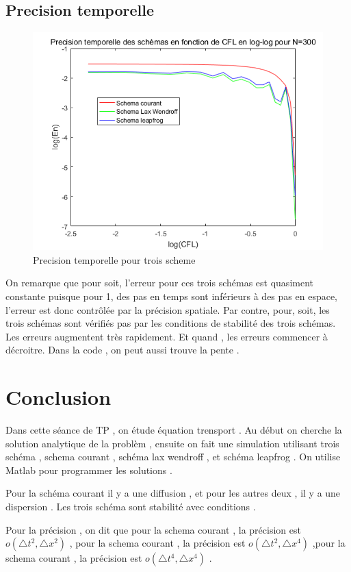 \documentclass[a4paper,10pt]{report} %
\begin{document}
\section{Precision temporelle }
\begin{figure}[h]
\begin{center}
\includegraphics[width=1.0\textwidth]{FIG/figure6.png}
\end{center}
\caption{Precision temporelle pour trois scheme}
\label{figure6}
\end{figure}

On remarque que pour  soit, l’erreur pour ces trois schémas est quasiment constante puisque pour 1, des pas en temps sont inférieurs à des pas en espace, l’erreur est donc contrôlée par la précision spatiale.
 Par contre, pour, soit, les trois schémas sont vérifiés pas par les conditions de stabilité des trois schémas. Les erreurs augmentent très rapidement. Et quand , les erreurs commencer à décroitre. 
 Dans la code , on peut aussi trouve la pente .
\chapter{Conclusion}

Dans cette séance de TP , on étude équation trensport . Au début on cherche la solution analytique de la problèm  , ensuite on fait une simulation utilisant trois schéma  , schema courant , schéma lax wendroff , et schéma leapfrog . On utilise Matlab pour programmer les solutions .

Pour la schéma courant il y a une diffusion , et pour les autres deux , il y a une dispersion . Les trois schéma sont stabilité avec conditions .   

Pour la précision , on dit que pour la schema courant , la précision est $o(\triangle t^2, \triangle x^2)$ , pour la schema courant , la précision est $o(\triangle t^2, \triangle x^4)$ ,pour la schema courant , la précision est $o(\triangle t^4, \triangle x^4)$ .







	
\end{document}
